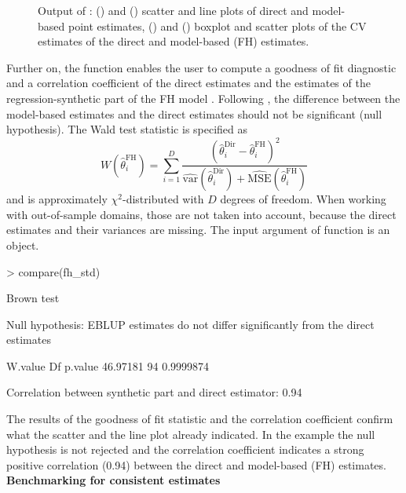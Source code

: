 \begin{figure}[h!]
\begin{subfigure}{0.48\textwidth}
		\caption{}
		\label{fig:comparef}
	\end{subfigure}
	\caption{Output of : () and
		() scatter and line plots of direct and model-based point
		estimates, () and () boxplot and scatter
		plots of the CV estimates
		of the direct and model-based (FH) estimates.}
	\label{fig:compare}
\end{figure}
\newline
Further on, the function  enables the user to compute a goodness of fit diagnostic \citep{Brown2001} and a correlation coefficient of the direct estimates and the estimates of the regression-synthetic part of the FH model \citep{Chandra2015}. Following \citet{Brown2001}, the difference between the model-based estimates and the direct estimates should not be significant (null hypothesis). The Wald test statistic is specified as
%
\begin{equation*}
W\left(\hat{\theta}_i^{\text{FH}}\right) = \sum_{i = 1}^{D} \frac{\left(\hat{\theta}_i^{\text{Dir}}-
	\hat{\theta}_i^{\text{FH}}\right)^2}{\widehat{\text{var}}\left(\hat{\theta}_i^{\text{Dir}}\right) + \widehat{\text{MSE}}\left(\hat{\theta}_i^{\text{FH}}\right)}
\end{equation*}
%
and is approximately $\chi^2$-distributed with $D$ degrees of freedom. When working with out-of-sample domains, those are not taken into account, because the direct estimates and their variances are missing. The input argument of function  is an  object.
\begin{example}
> compare(fh_std)

Brown test

Null hypothesis: EBLUP estimates do not differ significantly from the
      direct estimates

  W.value Df p.value
 46.97181 94 0.9999874

Correlation between synthetic part and direct estimator: 0.94
\end{example}
The results of the goodness of fit statistic and the correlation coefficient confirm what the scatter and the line plot already indicated. In the example the null hypothesis is not rejected and the correlation coefficient indicates a strong positive correlation (0.94) between the direct and model-based (FH) estimates.
\\ \newline
\textbf{Benchmarking for consistent estimates} \\

